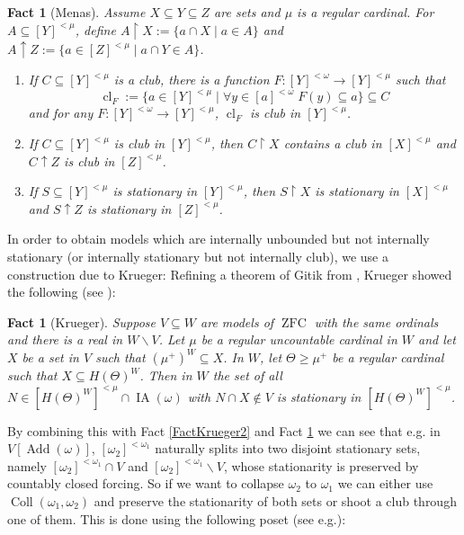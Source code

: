 \documentclass[a4paper]{amsart}
\theoremstyle{definition}
\theoremstyle{remark}
\theoremstyle{plain}
\newtheorem{myfact}[mydef]{Fact}
\numberwithin{mydef}{section}
\DeclareMathOperator{\ZFC}{ZFC}
\DeclareMathOperator{\Add}{Add}
\DeclareMathOperator{\Coll}{Coll}
\DeclareMathOperator{\IA}{IA}
\DeclareMathOperator{\cl}{cl}
\newcommand{\uhr}{\upharpoonright}
\begin{document}
	\begin{myfact}[Menas]\label{FactMenas}
		Assume $X\subseteq Y\subseteq Z$ are sets and $\mu$ is a regular cardinal. For $A\subseteq [Y]^{<\mu}$, define $A\uhr X:=\{a\cap X\;|\; a\in A\}$ and $A\uparrow Z:=\{a\in[Z]^{<\mu}\;|\;a\cap Y\in A\}$.
		
		\begin{enumerate}
			\item If $C\subseteq[Y]^{<\mu}$ is a club, there is a function $F\colon[Y]^{<\omega}\to[Y]^{<\mu}$ such that
			$$\cl_F:=\{a\in[Y]^{<\mu}\;|\;\forall y\in[a]^{<\omega}\;F(y)\subseteq a\}\subseteq C$$
			and for any $F\colon[Y]^{<\omega}\to[Y]^{<\mu}$, $\cl_F$ is club in $[Y]^{<\mu}$.
			\item If $C\subseteq[Y]^{<\mu}$ is club in $[Y]^{<\mu}$, then $C\uhr X$ contains a club in $[X]^{<\mu}$ and $C\uparrow Z$ is club in $[Z]^{<\mu}$.
			\item If $S\subseteq[Y]^{<\mu}$ is stationary in $[Y]^{<\mu}$, then $S\uhr X$ is stationary in $[X]^{<\mu}$ and $S\uparrow Z$ is stationary in $[Z]^{<\mu}$.
		\end{enumerate}
	\end{myfact}
	
	In order to obtain models which are internally unbounded but not internally stationary (or internally stationary but not internally club), we use a construction due to Krueger: Refining a theorem of Gitik from \cite{GitikNonsplit}, Krueger showed the following (see \cite[Theorem 7.1]{KruegerApplicMSI}):
	
	\begin{myfact}[Krueger]\label{FactKrueger}
		Suppose $V\subseteq W$ are models of $\ZFC$ with the same ordinals and there is a real in $W\smallsetminus V$. Let $\mu$ be a regular uncountable cardinal in $W$ and let $X$ be a set in $V$ such that $(\mu^+)^W\subseteq X$. In $W$, let $\Theta\geq\mu^+$ be a regular cardinal such that $X\subseteq H(\Theta)^W$. Then in $W$ the set of all $N\in[H(\Theta)^W]^{<\mu}\cap\IA(\omega)$ with $N\cap X\notin V$ is stationary in $[H(\Theta)^W]^{<\mu}$.
	\end{myfact}
	
	By combining this with Fact \ref{FactKrueger2} and Fact \ref{FactMenas} we can see that e.g. in  $V[\Add(\omega)]$, $[\omega_2]^{<\omega_1}$ naturally splits into two disjoint stationary sets, namely $[\omega_2]^{<\omega_1}\cap V$ and $[\omega_2]^{<\omega_1}\smallsetminus V$, whose stationarity is preserved by countably closed forcing. So if we want to collapse $\omega_2$ to $\omega_1$ we can either use $\Coll(\omega_1,\omega_2)$ and preserve the stationarity of both sets or shoot a club through one of them. This is done using the following poset (see e.g.\cite[Definition 2.5]{KruegerIntClubApproachLarge}):
	
\end{document}
